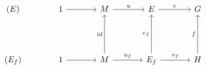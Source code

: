 \[
\begin{tikzcd}[column sep=3.6em, row sep=4.3em]
 (E)
 & 1 \arrow[r]
 & M \arrow[r,"u"]
 & E \arrow[r,"v"]
 & G
 \\
 (E_f)
 & 1 \arrow[r]
 & M \arrow[r,"u_f"] \arrow[u,"\mathrm{id}"]
 & E_f \arrow[r,"v_f"] \arrow[u,"e_f"]
 & H \arrow[u,"f"]
\end{tikzcd}
\]
